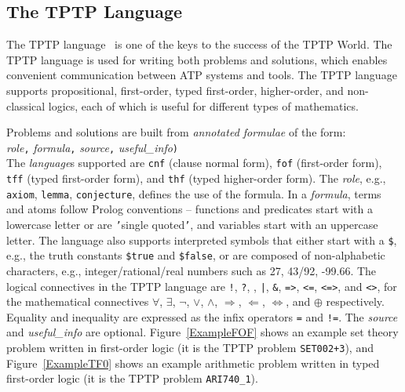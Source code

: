 \documentclass[runningheads]{llncs}
\newcommand{\smalltt}[1]{\small \texttt{#1}}
\begin{document}
\subsection{The TPTP Language}
\label{Languages}

The TPTP language~\cite{Sut23-IGPL} is one of the keys to the success of the TPTP World.
The TPTP language is used for writing both problems and solutions,
which enables convenient communication between ATP systems and tools.
The TPTP language supports propositional, first-order, typed first-order, higher-order, and
non-classical logics, each of which is useful for different types of mathematics.

Problems and solutions are built from {\em annotated formulae} of the form: \\
{\em role}{\tt ,}
{\em formula}{\tt ,}
{\em source}{\tt ,}
{\em useful\_info}{\tt )}\\
The {\em language}s supported are {\smalltt{cnf}} (clause normal form), {\smalltt{fof}}
(first-order form), {\smalltt{tff}} (typed first-order form), and {\smalltt{thf}}
(typed higher-order form).
The {\em role}, e.g., {\smalltt{axiom}}, {\smalltt{lemma}}, {\smalltt{conjecture}}, defines the 
use of the formula.
In a {\em formula}, terms and atoms follow Prolog conventions -- functions and predicates start 
with a lowercase letter or are {\tt '}single quoted{\tt '}, and variables start with an uppercase 
letter.
The language also supports interpreted symbols that either start with a {\tt \$}, e.g., the 
truth constants {\smalltt{\$true}} and {\smalltt{\$false}}, or are composed of 
non-alphabetic characters, e.g., integer/rational/real numbers such as 27, 43/92, -99.66.
The logical connectives in the TPTP language are
{\tt !}, {\tt ?}, {\tt {\raisebox{0.4ex}{\texttildelow}}}, {\tt |}, {\tt \&}, {\tt =>}, {\tt <=},
{\tt <=>}, and {\tt <{\raisebox{0.4ex}{\texttildelow}}>},
for the mathematical connectives
$\forall$, $\exists$, $\neg$, $\vee$, $\wedge$, $\Rightarrow$, $\Leftarrow$, $\Leftrightarrow$, 
and $\oplus$ respectively.
Equality and inequality are expressed as the infix operators {\tt =} and {\tt !=}.
The {\em source} and {\em useful\_info} are optional.
Figure~\ref{ExampleFOF} shows an example set theory problem written in first-order logic
(it is the TPTP problem {\tt SET002+3}), and Figure~\ref{ExampleTF0} shows an example
arithmetic problem written in typed first-order logic (it is the TPTP problem {\tt ARI740\_1}).
\end{document}
